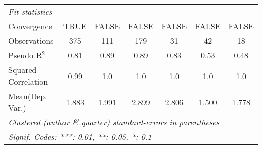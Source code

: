 \begin{tabular}{lcccccc}
   \midrule
   \emph{Fit statistics}\\
   Convergence                                                &TRUE         & FALSE           & FALSE       & FALSE   & FALSE        & FALSE\\  
   Observations                                               & 375         & 111             & 179         & 31      & 42           & 18\\  
   Pseudo R$^2$                                               & 0.81        & 0.89            & 0.89        & 0.83    & 0.53         & 0.48\\  
   Squared Correlation                                        & 0.99        & 1.0             & 1.0         & 1.0     & 1.0          & 1.0\\  
Mean(Dep. Var.) & 1.883 & 1.991 & 2.899 & 2.806 & 1.500 & 1.778 \\
   \midrule \midrule
   \multicolumn{7}{l}{\emph{Clustered (author \& quarter) standard-errors in parentheses}}\\
   \multicolumn{7}{l}{\emph{Signif. Codes: ***: 0.01, **: 0.05, *: 0.1}}\\
\end{tabular}
\par\endgroup
